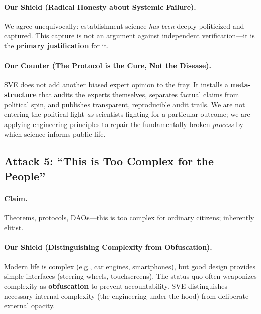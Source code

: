 \documentclass[11pt,a4paper]{article}
\theoremstyle{definition}
\theoremstyle{remark}
\begin{document}
\begin{small}
\begin{enumerate}
\begin{protocol}
\paragraph{\textbf{Our Shield (Radical Honesty about Systemic Failure).}} We agree unequivocally: establishment science \textit{has been} deeply politicized and captured. This capture is not an argument against independent verification—it is the \textbf{primary justification} for it.

\paragraph{\textbf{Our Counter (The Protocol is the Cure, Not the Disease).}} SVE does not add another biased expert opinion to the fray. It installs a \textbf{meta-structure} that audits the experts themselves, separates factual claims from political spin, and publishes transparent, reproducible audit trails. We are not entering the political fight \textit{as} scientists fighting for a particular outcome; we are applying engineering principles to repair the fundamentally broken \textit{process} by which science informs public life.

\vspace{1em}

\subsection*{\textcolor{accentcolor}{Attack 5: ``This is Too Complex for the People''}}

\paragraph{\textbf{Claim.}} Theorems, protocols, DAOs—this is too complex for ordinary citizens; inherently elitist.

\paragraph{\textbf{Our Shield (Distinguishing Complexity from Obfuscation).}} Modern life is complex (e.g., car engines, smartphones), but good design provides simple interfaces (steering wheels, touchscreens). The status quo often weaponizes complexity as \textbf{obfuscation} to prevent accountability. SVE distinguishes necessary internal complexity (the engineering under the hood) from deliberate external opacity.


\end{protocol}
\end{enumerate}
\end{small}
\end{document}
